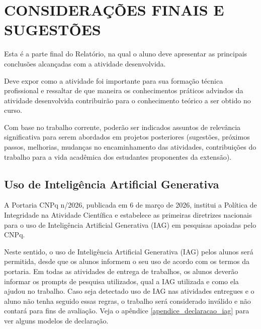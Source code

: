 \chapter{CONSIDERAÇÕES FINAIS E SUGESTÕES}
\label{capitulo-consideracoes-finais}
	Esta é a parte final do Relatório, na qual o aluno deve apresentar as principais conclusões alcançadas com a atividade desenvolvida.

	Deve expor como a atividade foi importante para sua formação técnica profissional e ressaltar de que maneira os conhecimentos práticos advindos da atividade desenvolvida contribuirão para o conhecimento teórico a ser obtido no curso.

	Com base no trabalho corrente, poderão ser indicados assuntos de relevância significativa para serem abordados em projetos posteriores (sugestões, próximos passos, melhorias, mudanças no encaminhamento das atividades, contribuições do trabalho para a vida acadêmica dos estudantes proponentes da extensão). 
	
    \section{Uso de Inteligência Artificial Generativa}
    \label{capitulo-consideracoes-iag}
    A Portaria CNPq n/2026, publicada em 6 de março de 2026, institui a Política de Integridade na Atividade Científica e estabelece as primeiras diretrizes nacionais para o uso de Inteligência Artificial Generativa (IAG) em pesquisas apoiadas pelo CNPq.

    Neste sentido, o uso de Inteligência Artificial Generativa (IAG) pelos alunos será permitida, desde que os alunos informem o seu uso de acordo com os termos da portaria. Em todas as atividades de entrega de trabalhos, os alunos deverão informar os prompts de pesquisa utilizados, qual a IAG utilizada e como ela ajudou no trabalho. Caso seja detectado uso de IAG nas atividades entregues e o aluno não tenha seguido essas regras, o trabalho será considerado inválido e não contará para fins de avaliação. Veja o apêndice \ref{apendice_declaracao_iag} para ver alguns modelos de declaração.

